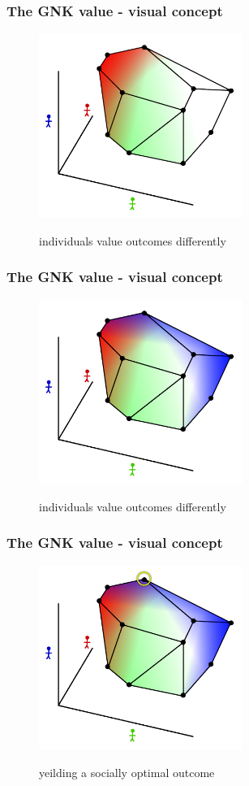 \documentclass{beamer}
\begin{document}
\begin{frame} \frametitle{The GNK value - visual concept} \begin{figure} \begin{center} \includegraphics[height=6cm]{figs/pp7} \end{center} individuals value outcomes differently \end{figure} \end{frame}
\begin{frame} \frametitle{The GNK value - visual concept} \begin{figure} \begin{center} \includegraphics[height=6cm]{figs/pp8} \end{center} individuals value outcomes differently \end{figure} \end{frame}
\begin{frame} \frametitle{The GNK value - visual concept} \begin{figure} \begin{center} \includegraphics[height=6cm]{figs/pp9} \end{center} yeilding a socially optimal outcome \end{figure} \end{frame}
\end{document}

